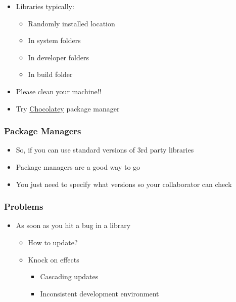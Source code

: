 \begin{itemize}
\itemsep1pt\parskip0pt
\item
  Libraries typically:

  \begin{itemize}
  \itemsep1pt\parskip0pt
  \item
    Randomly installed location
  \item
    In system folders
  \item
    In developer folders
  \item
    In build folder
  \end{itemize}
\item
  Please clean your machine!!
\item
  Try \href{http://chocolatey.org}{Chocolatey} package manager
\end{itemize}

\subsubsection{Package Managers}\label{package-managers-1}

\begin{itemize}
\itemsep1pt\parskip0pt
\item
  So, if you can use standard versions of 3rd party libraries
\item
  Package managers are a good way to go
\item
  You just need to specify what versions so your collaborator can check
\end{itemize}

\subsubsection{Problems}\label{problems}

\begin{itemize}
\itemsep1pt\parskip0pt
\item
  As soon as you hit a bug in a library

  \begin{itemize}
  \itemsep1pt\parskip0pt
  \item
    How to update?
  \item
    Knock on effects

    \begin{itemize}
    \itemsep1pt\parskip0pt
    \item
      Cascading updates
    \item
      Inconsistent development environment
    \end{itemize}
  \end{itemize}
\end{itemize}

